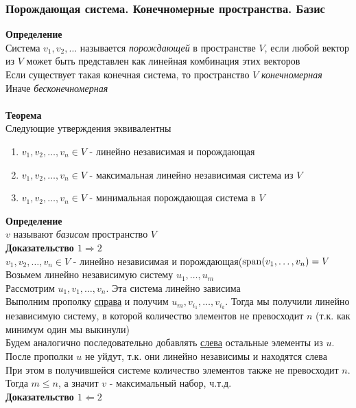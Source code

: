 \documentclass[12pt]{article}
\begin{document}
\subsubsection{Порождающая система. Конечномерные пространства. Базис}
\textbf{Определение}\\
Система $v_1, v_2, \ldots$ называется \textit{порождающей} в пространстве $V$, если любой вектор из $V$ может быть представлен как линейная комбинация этих векторов\\
Если существует такая конечная система, то пространство $V$ \textit{конечномерная}\\
Иначе \textit{бесконечномерная}\\\\
\textbf{Теорема}\\
Следующие утверждения эквивалентны
\begin{enumerate}
    \item $v_1, v_2, \ldots, v_n \in V$ - линейно независимая и порождающая
    \item $v_1, v_2, \ldots, v_n \in V$ - максимальная линейно независимая система из $V$
    \item $v_1, v_2, \ldots, v_n \in V$ - минимальная порождающая система в $V$
\end{enumerate}
\textbf{Определение}\\
$v$ называют \textit{базисом} пространство $V$\\
\textbf{Доказательство $1 \Rightarrow 2$}\\
$v_1, v_2, \ldots, v_n \in V$ - линейно независимая и порождающая($\operatorname{span}(v_1, \ldots, v_n) = V$\\
Возьмем линейно независимую систему $u_1, \ldots, u_m$\\
Рассмотрим $u_1, v_1, \ldots, v_n$. Эта система линейно зависима\\
Выполним прополку \underline{справа} и получим $u_m, v_{i_1}, \ldots, v_{i_k}$. Тогда мы получили линейно независимую систему, в которой количество элементов не превосходит $n$ (т.к. как минимум один мы выкинули)\\
Будем аналогично последовательно добавлять \underline{слева} остальные элементы из $u$. После прополки $u$ не уйдут, т.к. они линейно независимы и находятся слева\\
При этом в получившейся системе количество элементов также не превосходит $n$. Тогда $m \leq n$, а значит $v$ - максимальный набор, ч.т.д.\\
\textbf{Доказательство $1 \Leftarrow 2$}\\
\end{document}
